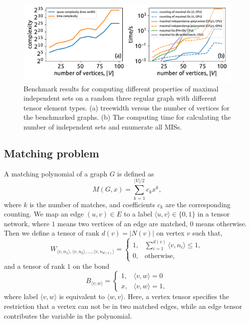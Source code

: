 \documentclass[onefignum, onetabnum]{siamart190516}
\newcommand{\<}{\langle}
\renewcommand{\>}{\rangle}
\begin{document}
\begin{figure} 
    \centering
    \includegraphics[width=\textwidth, trim={0cm 0cm 0cm 0cm}, clip]{figures/fig2.pdf}
    \caption{Benchmark results for computing different properties of maximal independent sets on a random three regular graph with different tensor element types.
    (a) treewidth versus the number of vertices for the benchmarked graphs. 
    (b) The computing time for calculating the number of independent sets and enumerate all MISs.
    }
    \label{fig:benchmark-maximal}
\end{figure}


\subsection{Matching problem}
A matching polynomial of a graph $G$ is defined as
\begin{equation}
    M(G, x) = \sum\limits_{k=1}^{|V|/2} c_k x^k,
\end{equation}
where $k$ is the number of matches, and coefficients $c_k$ are the corresponding counting.
We map an edge $(u, v) \in E$ to a label $\langle u, v\rangle \in \{0, 1\}$ in a tensor network,
where $1$ means two vertices of an edge are matched, $0$ means otherwise.
Then we define a tensor of rank $d(v) = |N(v)|$ on vertex $v$ such that,
\begin{equation}
    W_{\langle v, n_1\rangle, \langle v, n_2 \rangle, \ldots, \langle v, n_{d(v)}\rangle} = \begin{cases}
        1, & \sum_{i=1}^{d(v)} \langle v, n_i \rangle \leq 1,\\
        0, & \text{otherwise},
    \end{cases}
\end{equation}
and a tensor of rank $1$ on the bond
\begin{equation}
    B_{\langle v, w\rangle} = \begin{cases}
    1, & \langle v, w \rangle = 0 \\
    x, & \langle v, w \rangle = 1,
\end{cases}
\end{equation}
where label $\langle v, w \rangle$ is equivalent to $\langle w,v\rangle$.
Here, a vertex tensor specifies the restriction that a vertex can not be in two matched edges, while an edge tensor contributes the variable in the polynomial.
\end{document}
